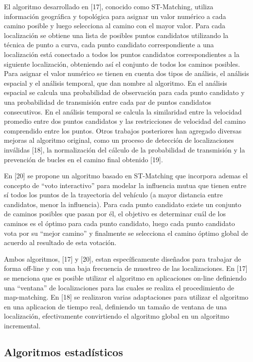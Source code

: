 \documentclass[final,fmstyle]{fpunathesis}
\begin{document}
El algoritmo desarrollado en [17], conocido como ST-Matching, utiliza información geográfica y topológica para asignar un valor numérico a cada camino posible y luego selecciona al camino con el mayor valor. Para cada localización se obtiene una lista de  posibles puntos candidatos utilizando la técnica de punto a curva, cada punto candidato correspondiente a una localización está conectado a todos los puntos candidatos correspondientes a la siguiente localización, obteniendo así el conjunto de todos los caminos posibles. Para asignar el valor numérico se tienen en cuenta dos tipos de análisis, el análisis espacial y el análisis temporal, que dan nombre al algoritmo. En el análisis espacial se calcula una probabilidad de observación para cada punto candidato y una probabilidad de transmisión entre cada par de puntos candidatos consecutivos. En el análisis temporal se calcula la similaridad entre la velocidad promedio entre dos puntos candidatos y las restricciones de velocidad del camino comprendido entre los puntos. Otros trabajos posteriores han agregado diversas mejoras al algoritmo original, como un proceso de detección de localizaciones inválidas [18], la normalización del cálculo de la probabilidad de transmisión y la prevención de bucles en el camino final obtenido [19].

En [20] se propone un algoritmo basado en ST-Matching que incorpora ademas el concepto de “voto interactivo” para modelar la influencia mutua que tienen entre sí todos los puntos de la trayectoria del vehículo (a mayor distancia entre candidatos, menor la influencia). Para cada punto candidato existe un conjunto de caminos posibles que pasan por él, el objetivo es determinar cuál de los caminos es el óptimo para cada punto candidato, luego cada punto candidato vota por su “mejor camino” y finalmente se selecciona el camino óptimo global de acuerdo al resultado de esta votación.

Ambos algoritmos, [17] y [20], estan específicamente diseñados para trabajar de forma off-line y con una baja frecuencia de muestreo de las localizaciones. En [17] se  menciona que es posible utilizar el algoritmo en aplicaciones on-line definiendo una “ventana” de localizaciones para las cuales se realiza el procedimiento de map-matching. En [18] se realizaron varias adaptaciones para utilizar el algoritmo en una aplicacion de tiempo real, definiendo un tamaño de ventana de una localización, efectivamente convirtiendo el algoritmo global en un algoritmo incremental.

\subsection{Algoritmos estadísticos}
\end{document}

